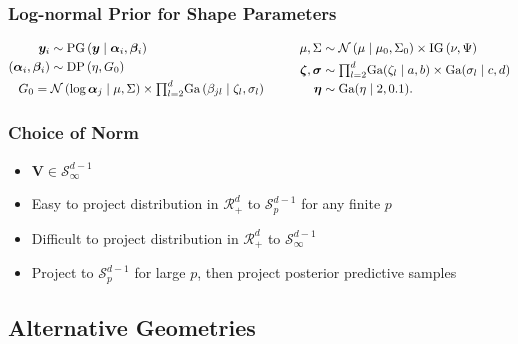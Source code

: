 \documentclass[aspectratio=169]{beamer}
\begin{document}
\begin{frame}
  \frametitle{Log-normal Prior for Shape Parameters}
  \begin{equation*}
    \begin{aligned}
      \bm{ y}_i &\sim \text{PG}\left(\bm{ y}\mid \bm{ \alpha}_i, \bm{\beta}_i\right)\\
      (\bm{\alpha}_i, \bm{\beta}_i) &\sim \text{DP}\left(\eta, G_0\right)\\
        &~\hspace{-1cm}G_0 = \mathcal{N}\left(\log\bm{ \alpha}_{j}\mid\mu,\Sigma\right)\times
            {\textstyle\prod}_{l = 2}^d\text{Ga}\left(\beta_{jl}\mid\zeta_l,\sigma_l\right)
    \end{aligned}
    \hspace{1cm}
    \begin{aligned}
      \mu,\Sigma &\sim \mathcal{N}\left(\mu\mid\mu_0,\Sigma_0\right)
                                  \times \text{IG}\left(\nu,\Psi\right)\\
      \bm{ \zeta},\bm{\sigma} &\sim {\textstyle\prod}_{l = 2}^d\text{Ga}(\zeta_l \mid a,b)
                                \times \text{Ga}(\sigma_l \mid c,d) \\
      \bm{ \eta} &\sim \text{Ga}(\eta \mid 2, 0.1).
    \end{aligned}
  \end{equation*}
\end{frame}

\begin{frame}
  \frametitle{Choice of Norm}
  \begin{itemize}
    \item $\bm{V} \in \mathcal{S}_{\infty}^{d-1}$
    \pause
    \item Easy to project distribution in $\mathcal{R}_+^{d}$ to $\mathcal{S}_{p}^{d-1}$ for any finite $p$
    \pause
    \item Difficult to project distribution in $\mathcal{R}_+^{d}$ to $\mathcal{S}_{\infty}^{d-1}$
    \pause
    \item Project to $\mathcal{S}_{p}^{d-1}$ for large $p$, then project posterior predictive samples
  \end{itemize}
\end{frame}

\subsection{Alternative Geometries}
\end{document}
